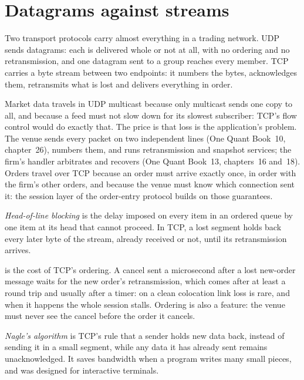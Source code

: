 \section{Datagrams against streams}

Two transport protocols carry almost everything in a trading network. UDP sends datagrams: each is delivered whole or not at
all, with no ordering and no retransmission, and one datagram sent to a group reaches every member. TCP carries a byte
stream between two endpoints: it numbers the bytes, acknowledges them, retransmits what is lost and delivers everything in
order.

Market data travels in UDP multicast because only multicast sends one copy to all, and because a feed must not slow down
for its slowest subscriber: TCP's flow control would do exactly that. The price is that loss is the application's problem. The
venue sends every packet on two independent lines (One Quant Book~10, chapter~26), numbers them, and runs retransmission and
snapshot services; the firm's handler arbitrates and recovers (One Quant Book~13, chapters~16 and~18). Orders travel over TCP
because an order must arrive exactly once, in order with the firm's other orders, and because the venue must know which
connection sent it: the session layer of the order-entry protocol builds on those guarantees.

\begin{definition}\label{def:nw:networking-for-trading:hol}
\emph{Head-of-line blocking} is the delay imposed on every item in an ordered queue by one item at
its head that cannot proceed. In TCP, a lost segment holds back every later byte of the stream, already received or not, until
its retransmission arrives.
\end{definition}

 is the cost of TCP's ordering. A cancel sent a microsecond after a lost new-order message waits for the
new order's retransmission, which comes after at least a round trip and usually after a timer: on a clean colocation link loss
is rare, and when it happens the whole session stalls. Ordering is also a feature: the venue must never see the cancel before
the order it cancels.

\begin{definition}\label{def:nw:networking-for-trading:nagle}
\emph{Nagle's algorithm} is TCP's rule that a sender holds new data back, instead of sending it in a
small segment, while any data it has already sent remains unacknowledged. It saves bandwidth when a program writes many small
pieces, and was designed for interactive terminals.
\end{definition}

